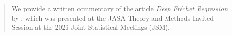 \begin{abstract}
We provide a written commentary of the article \emph{Deep Fr\'echet Regression} by \textcite{iao_deep_2025}, which was presented at the JASA Theory and Methods Invited Session at the 2026 Joint Statistical Meetings (JSM).
\end{abstract}